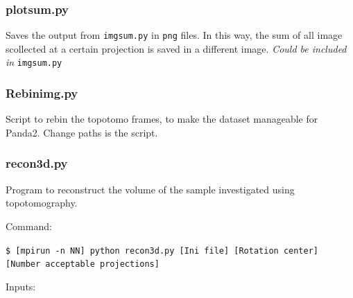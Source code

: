 \documentclass[11pt]{scrartcl}
\begin{document}
\subsubsection{plot\textunderscore sum.py}

Saves the output from {\texttt{img\textunderscore sum.py}} in {\texttt{png}} files. In this way, the sum of all image scollected at a certain projection is saved in a different image. {\textit{Could be included in}} {\texttt{img\textunderscore sum.py}}

\subsubsection{Rebin\textunderscore img.py}
\label{sub_s:rebin}

Script to rebin the topotomo frames, to make the dataset manageable for Panda2. Change paths is the script.

\subsubsection{recon3d.py}

Program to reconstruct the volume of the sample investigated using topotomography. 

Command: 

{\texttt{\$ [mpirun -n NN] python recon3d.py [Ini file] [Rotation center] [Number acceptable projections]}}

Inputs:
\end{document}
